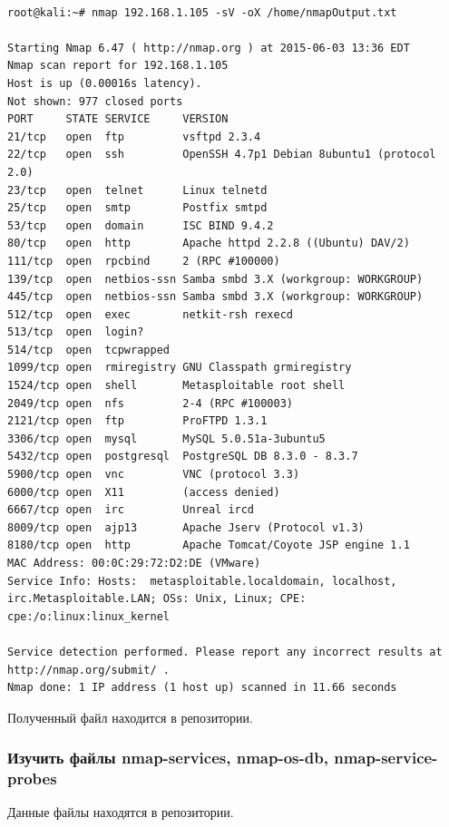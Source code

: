 \documentclass[10pt,a4paper]{article}
\begin{document}
\begin{lstlisting}

root@kali:~# nmap 192.168.1.105 -sV -oX /home/nmapOutput.txt

Starting Nmap 6.47 ( http://nmap.org ) at 2015-06-03 13:36 EDT
Nmap scan report for 192.168.1.105
Host is up (0.00016s latency).
Not shown: 977 closed ports
PORT     STATE SERVICE     VERSION
21/tcp   open  ftp         vsftpd 2.3.4
22/tcp   open  ssh         OpenSSH 4.7p1 Debian 8ubuntu1 (protocol 2.0)
23/tcp   open  telnet      Linux telnetd
25/tcp   open  smtp        Postfix smtpd
53/tcp   open  domain      ISC BIND 9.4.2
80/tcp   open  http        Apache httpd 2.2.8 ((Ubuntu) DAV/2)
111/tcp  open  rpcbind     2 (RPC #100000)
139/tcp  open  netbios-ssn Samba smbd 3.X (workgroup: WORKGROUP)
445/tcp  open  netbios-ssn Samba smbd 3.X (workgroup: WORKGROUP)
512/tcp  open  exec        netkit-rsh rexecd
513/tcp  open  login?
514/tcp  open  tcpwrapped
1099/tcp open  rmiregistry GNU Classpath grmiregistry
1524/tcp open  shell       Metasploitable root shell
2049/tcp open  nfs         2-4 (RPC #100003)
2121/tcp open  ftp         ProFTPD 1.3.1
3306/tcp open  mysql       MySQL 5.0.51a-3ubuntu5
5432/tcp open  postgresql  PostgreSQL DB 8.3.0 - 8.3.7
5900/tcp open  vnc         VNC (protocol 3.3)
6000/tcp open  X11         (access denied)
6667/tcp open  irc         Unreal ircd
8009/tcp open  ajp13       Apache Jserv (Protocol v1.3)
8180/tcp open  http        Apache Tomcat/Coyote JSP engine 1.1
MAC Address: 00:0C:29:72:D2:DE (VMware)
Service Info: Hosts:  metasploitable.localdomain, localhost, irc.Metasploitable.LAN; OSs: Unix, Linux; CPE: cpe:/o:linux:linux_kernel

Service detection performed. Please report any incorrect results at http://nmap.org/submit/ .
Nmap done: 1 IP address (1 host up) scanned in 11.66 seconds

\end{lstlisting}

Полученный файл находится в репозитории.

\subsubsection{Изучить файлы nmap-services, nmap-os-db, nmap-service-probes}

Данные файлы находятся в репозитории.
\end{document}
